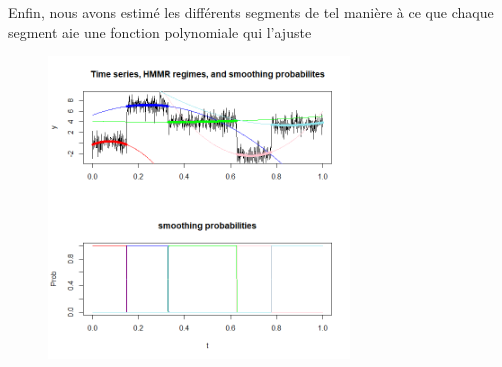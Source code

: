 \documentclass[11pt]{article}
\begin{document}
Enfin, nous avons estimé les différents segments de tel manière à ce que chaque segment aie une fonction polynomiale qui l'ajuste

\begin{figure}[h]
\begin{center}
\includegraphics[height=8cm]{lissage.png}
\end{center}
\end{figure}
\end{document}
